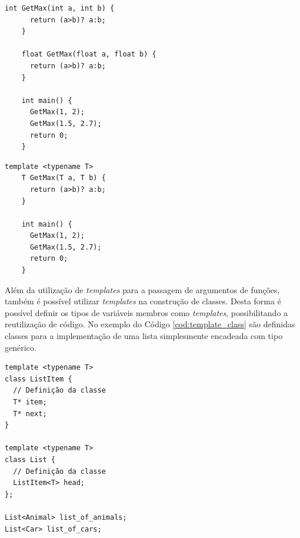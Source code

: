 \noindent
\begin{minipage}{.45\textwidth}
  \begin{lstlisting}[caption = {Função \textit{GetMax} sem \textit{templates}},
    source = {Autoria própria},
    label = {cod:getmax_regular}]
    int GetMax(int a, int b) {
      return (a>b)? a:b;
    }
    
    float GetMax(float a, float b) {
      return (a>b)? a:b;
    }
    
    int main() {
      GetMax(1, 2);
      GetMax(1.5, 2.7);
      return 0;
    }
    \end{lstlisting}
\end{minipage}\hfill
\begin{minipage}{.45\textwidth}
  \begin{lstlisting}[caption = {Função \textit{GetMax} com \textit{templates}},
    source = {Autoria própria},
    label = {cod:getmax_template}]
    template <typename T>
    T GetMax(T a, T b) {
      return (a>b)? a:b;
    }
    
    int main() {
      GetMax(1, 2);
      GetMax(1.5, 2.7);
      return 0;
    }
    \end{lstlisting}
\end{minipage}

Além da utilização de \textit{templates} para a passagem de argumentos de
funções, também é possível utilizar \textit{templates} na construção de classes.
Desta forma é possível definir os tipos de variáveis membros como
\textit{templates}, possibilitando a reutilização de código. No exemplo do
Código \ref{cod:template_class} são definidas classes para a implementação de
uma lista simplesmente encadeada com tipo genérico.

\begin{lstlisting}[caption = {Classe genérica com \textit{templates}},
source = {Autoria própria},
label = {cod:template_class}]
template <typename T>
class ListItem {
  // Definição da classe
  T* item;
  T* next;
}

template <typename T>
class List {
  // Definição da classe
  ListItem<T> head;
};

List<Animal> list_of_animals;
List<Car> list_of_cars;
\end{lstlisting}

